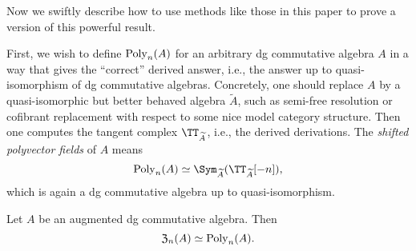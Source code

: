 Now we swiftly describe how to use methods like those in this paper to prove a version of this powerful result.


First, we wish to define ${\rm Poly}_n(A)$ for an arbitrary dg commutative algebra $A$ in a way that gives the ``correct'' derived answer, i.e., the answer up to quasi-isomorphism of dg commutative algebras.
Concretely, one should replace $A$ by a quasi-isomorphic but better behaved algebra $\widetilde{A}$, 
such as semi-free resolution or cofibrant replacement with respect to some nice model category structure.
Then one computes the tangent complex $\TT_{\widetilde{A}}$, i.e., the derived derivations.
The {\em shifted polyvector fields} of $A$ means
\[
{\rm Poly}_n(A) \simeq \Sym_{\widetilde{A}} (\TT_{\widetilde{A}}[-n]),
\]
which is again a dg commutative algebra up to quasi-isomorphism.


\begin{prp}
Let $A$ be an augmented dg commutative algebra.
Then 
\[
{\frak Z}_n(A) \simeq {\rm Poly}_n(A).
\]
\end{prp}


